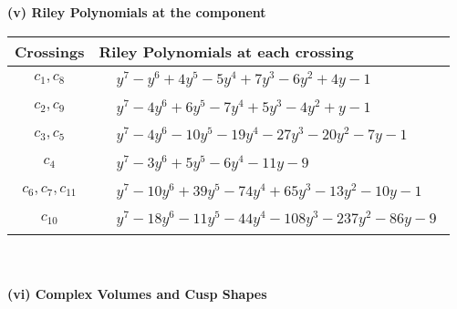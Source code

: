 \documentclass[1p]{elsarticle_modified}
\theoremstyle{definition}
\begin{document}
\flushleft \textbf{(v) Riley Polynomials at the component}\newline \\
\begin{tabular}{m{50pt}|m{274pt}}
Crossings & \hspace{64pt}Riley Polynomials at each crossing \\
\hline $$\begin{aligned}c_{1},c_{8}\end{aligned}$$&$\begin{aligned}
&y^7- y^6+4 y^5-5 y^4+7 y^3-6 y^2+4 y-1
\end{aligned}$\\
\hline $$\begin{aligned}c_{2},c_{9}\end{aligned}$$&$\begin{aligned}
&y^7-4 y^6+6 y^5-7 y^4+5 y^3-4 y^2+y-1
\end{aligned}$\\
\hline $$\begin{aligned}c_{3},c_{5}\end{aligned}$$&$\begin{aligned}
&y^7-4 y^6-10 y^5-19 y^4-27 y^3-20 y^2-7 y-1
\end{aligned}$\\
\hline $$\begin{aligned}c_{4}\end{aligned}$$&$\begin{aligned}
&y^7-3 y^6+5 y^5-6 y^4-11 y-9
\end{aligned}$\\
\hline $$\begin{aligned}c_{6},c_{7},c_{11}\end{aligned}$$&$\begin{aligned}
&y^7-10 y^6+39 y^5-74 y^4+65 y^3-13 y^2-10 y-1
\end{aligned}$\\
\hline $$\begin{aligned}c_{10}\end{aligned}$$&$\begin{aligned}
&y^7-18 y^6-11 y^5-44 y^4-108 y^3-237 y^2-86 y-9
\end{aligned}$\\
\hline
\end{tabular}\\~\\
\newpage\flushleft \textbf{(vi) Complex Volumes and Cusp Shapes}
\end{document}
